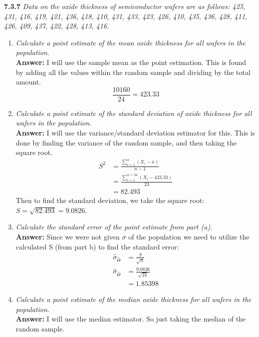 \documentclass[11pt]{article}
\begin{document}
\noindent \textbf{7.3.7} \emph{ Data on the oxide thickness of semiconductor wafers are as follows: 425, 431, 416, 419, 421, 436, 418, 410, 431, 433, 423, 426, 410, 435, 436, 428, 411, 426, 409, 437, 422, 428, 413, 416.}
\begin{enumerate}
\item \emph{Calculate a point estimate of the mean oxide thickness for all wafers in the population.}
\\\textbf{Answer:} I will use the sample mean as the point estimation. This is found by adding all the values within the random sample and dividing by the total amount. 
\begin{equation}
\frac{10160}{24} = 423.33
\end{equation}
\item \emph{Calculate a point estimate of the standard deviation of oxide thickness for all wafers in the population.}
\\\textbf{Answer:} I will use the variance/standard deviation estimator for this. This is done by finding the variance of the random sample, and then taking the square root. 
\begin{equation}
\begin{split}
S^2 &= \frac{\sum_{i=1}^n(X_i - \bar{x})}{n-1}\\
&=\frac{\sum_{i=1}^{n=24}(X_i - 423.33)}{23}\\
&=82.493
\end{split}
\end{equation}
Then to find the standard deviation, we take the square root: $S = \sqrt{82.493} = 9.0826$.
\item \emph{Calculate the standard error of the point estimate from part (a).}
\\\textbf{Answer:} Since we were not given $\sigma$ of the population we need to utilize the calculated S (from part b) to find the standard error:
\begin{equation}
\begin{split}
\hat{\sigma}_{\hat{\Theta}} &= \frac{S}{\sqrt{n}} \\
\hat{\sigma}_{\hat{\Theta}} &=\frac{9.0826}{\sqrt{24}}\\
&= 1.85398
\end{split}
\end{equation}
\item \emph{Calculate a point estimate of the median oxide thickness for all wafers in the population.}
\\\textbf{Answer:} I will use the median estimator. So just taking the median of the random sample.\\\\

\end{enumerate}
\end{document}
